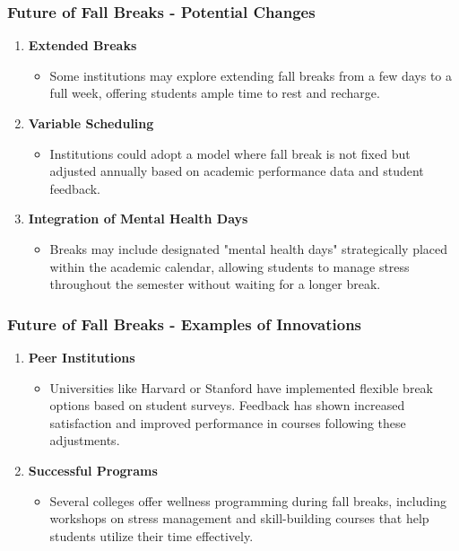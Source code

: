 \documentclass[aspectratio=169]{beamer}
\begin{document}
\begin{frame}[fragile]
    \frametitle{Future of Fall Breaks - Potential Changes}
    \begin{enumerate}
        \item \textbf{Extended Breaks}
        \begin{itemize}
            \item Some institutions may explore extending fall breaks from a few days to a full week, offering students ample time to rest and recharge.
        \end{itemize}
        
        \item \textbf{Variable Scheduling}
        \begin{itemize}
            \item Institutions could adopt a model where fall break is not fixed but adjusted annually based on academic performance data and student feedback.
        \end{itemize}
        
        \item \textbf{Integration of Mental Health Days}
        \begin{itemize}
            \item Breaks may include designated "mental health days" strategically placed within the academic calendar, allowing students to manage stress throughout the semester without waiting for a longer break.
        \end{itemize}
    \end{enumerate}
\end{frame}

\begin{frame}[fragile]
    \frametitle{Future of Fall Breaks - Examples of Innovations}
    \begin{enumerate}
        \item \textbf{Peer Institutions}
        \begin{itemize}
            \item Universities like Harvard or Stanford have implemented flexible break options based on student surveys. 
            Feedback has shown increased satisfaction and improved performance in courses following these adjustments.
        \end{itemize}

        \item \textbf{Successful Programs}
        \begin{itemize}
            \item Several colleges offer wellness programming during fall breaks, including workshops on stress management and skill-building courses that help students utilize their time effectively.
        \end{itemize}
    \end{enumerate}
\end{frame}
\end{document}
